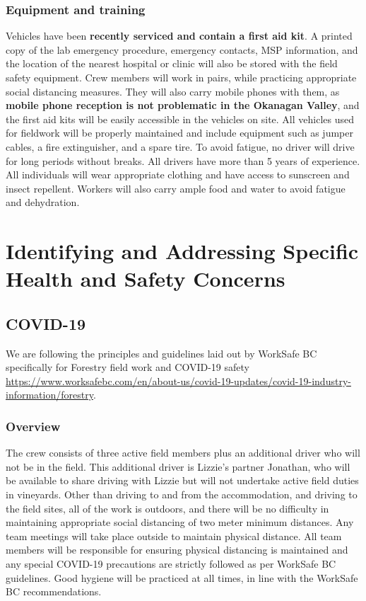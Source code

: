 \documentclass[11pt,letter]{article}
\begin{document}
\subsubsection{Equipment and training}
Vehicles have been \textbf{recently serviced and contain a first aid kit}. A printed copy of the lab emergency procedure, emergency contacts, MSP information, and the location of the nearest hospital or clinic will also be stored with the field safety equipment. Crew members will work in pairs, while practicing appropriate social distancing measures. They will also carry mobile phones with them, as \textbf{mobile phone reception is not problematic in the Okanagan Valley}, and the first aid kits will be easily accessible in the vehicles on site. All vehicles used for fieldwork will be properly maintained and include equipment such as jumper cables, a fire extinguisher, and a spare tire. To avoid fatigue, no driver will drive for long periods without breaks. All drivers have more than 5 years of experience. All individuals will wear appropriate clothing and have access to sunscreen and insect repellent. Workers will also carry ample food and water to avoid fatigue and dehydration.  


\section{Identifying and Addressing Specific Health and Safety Concerns}

\subsection{COVID-19}

We are following the principles and guidelines laid out by WorkSafe BC specifically for Forestry field work and COVID-19 safety \url{https://www.worksafebc.com/en/about-us/covid-19-updates/covid-19-industry-information/forestry}. 

\subsubsection{Overview}
The crew consists of three active field members plus an additional driver who will not be in the field. This additional driver is Lizzie's partner Jonathan, who will be available to share driving with Lizzie but will not undertake active field duties in vineyards. Other than driving to and from the accommodation, and driving to the field sites, all of the work is outdoors, and there will be no difficulty in maintaining appropriate social distancing of two meter minimum distances. Any team meetings will take place outside to maintain physical distance. All team members will be responsible for ensuring physical distancing is maintained and any special COVID-19 precautions are strictly followed as per WorkSafe BC guidelines. Good hygiene will be practiced at all times, in line with the  WorkSafe BC recommendations. 
\end{document}
